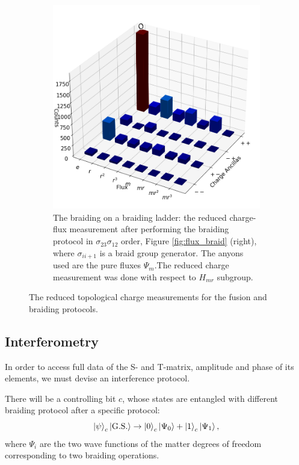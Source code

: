 \documentclass[two column]{article}
\begin{document}
\begin{figure}
\begin{subfigure}{0.47\textwidth}
    \includegraphics[width=\linewidth]{Figures/braid_link.png}
    \caption{The braiding on a braiding ladder: the reduced charge-flux measurement after performing the braiding protocol in $\sigma_{23}\sigma_{12}$ order, Figure \ref{fig:flux_braid} (right), where $\sigma_{ii+1}$ is a braid group generator. The anyons used are the pure fluxes $\Psi_m$.The reduced charge measurement was done with respect to $H_{mr}$ subgroup.}
    \label{fig:braid_link}
\end{subfigure}
\caption{The reduced topological charge measurements for the fusion and braiding protocols.}
\label{fig:red_charge_res}
\end{figure}


\subsection{Interferometry}\label{subsec:Intef}

In order to access full data of the S- and T-matrix, amplitude and phase of its elements, we must devise an interference protocol.

There will be a controlling bit $c$, whose states are entangled with different braiding protocol after a specific protocol:
\begin{equation}
    \ket{\psi}_c\ket{\text{G.S.}} \rightarrow \ket{0}_c \ket{\Psi_0} + \ket{1}_c \ket{\Psi_1},
\end{equation}
where $\Psi_i$ are the two wave functions of the matter degrees of freedom corresponding to two braiding operations.
\end{document}
